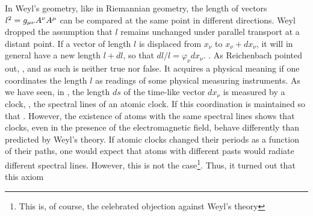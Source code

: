 \documentclass[draft]{article}
\newcommand{\phin}{\ensuremath{\varphi_\nu}\xspace}
\newcommand{\WT}{Weyl's theory\xspace}
\newcommand{\WG}{Weyl's geometry\xspace}
\begin{document}

\begin{W}
\item\label{W1} In \WG, like in Riemannian geometry, the length of vectors  $l^2=g_{\mu\nu} A^\nu A^\mu$ can be compared at the same point in different directions. Weyl dropped the assumption that $l$ remains unchanged under parallel transport at a distant point. If a vector of length $l$ is displaced from $x_\nu$ to $x_\nu+dx_\nu$, it will in general have a new length $l+dl$, so that $dl/l=\phin dx_\nu$. . As Reichenbach pointed out,  \citep[366]{Reichenbach1922a}, and as such is neither true nor false. It acquires a physical meaning if one coordinates the length $l$ as readings of some physical measuring instruments. As we have seen, in \gr, the length $ds$ of the time-like vector $dx_\nu$ is measured by a clock, \eg, the spectral lines of an atomic clock. If this coordination is maintained so that  \citep[366]{Reichenbach1922a}. However, the existence of atoms with the same spectral lines shows that clocks, even in the presence of the electromagnetic field, behave differently than predicted by \WT. If atomic clocks changed their periods as a function of their \spti paths, one would expect that atoms with different pasts would radiate different spectral lines. However, this is not the case\footnote{This is, of course, the celebrated objection against \WT {}}. Thus, it turned out that this axiom   \citep[366]{Reichenbach1922a}


\end{W}
\end{document}
